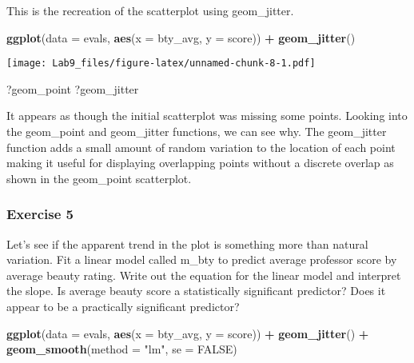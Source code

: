 \documentclass[
]{article}
\newenvironment{Shaded}{\begin{snugshade}}{\end{snugshade}}
\newcommand{\DataTypeTok}[1]{\textcolor[rgb]{0.13,0.29,0.53}{#1}}
\newcommand{\KeywordTok}[1]{\textcolor[rgb]{0.13,0.29,0.53}{\textbf{#1}}}
\newcommand{\NormalTok}[1]{#1}
\newcommand{\OperatorTok}[1]{\textcolor[rgb]{0.81,0.36,0.00}{\textbf{#1}}}
\newcommand{\OtherTok}[1]{\textcolor[rgb]{0.56,0.35,0.01}{#1}}
\newcommand{\StringTok}[1]{\textcolor[rgb]{0.31,0.60,0.02}{#1}}
\begin{document}
This is the recreation of the scatterplot using geom\_jitter.

\begin{Shaded}
\begin{Highlighting}[]
\KeywordTok{ggplot}\NormalTok{(}\DataTypeTok{data =}\NormalTok{ evals, }\KeywordTok{aes}\NormalTok{(}\DataTypeTok{x =}\NormalTok{ bty_avg, }\DataTypeTok{y =}\NormalTok{ score)) }\OperatorTok{+}
\StringTok{  }\KeywordTok{geom_jitter}\NormalTok{()}
\end{Highlighting}
\end{Shaded}

\texttt{[image: Lab9\_files/figure-latex/unnamed-chunk-8-1.pdf]}

\begin{Shaded}
\begin{Highlighting}[]
\NormalTok{?geom_point}
\NormalTok{?geom_jitter}
\end{Highlighting}
\end{Shaded}

It appears as though the initial scatterplot was missing some points.
Looking into the geom\_point and geom\_jitter functions, we can see why.
The geom\_jitter function adds a small amount of random variation to the
location of each point making it useful for displaying overlapping
points without a discrete overlap as shown in the geom\_point
scatterplot.

\hypertarget{exercise-5}{%
\subsubsection{Exercise 5}\label{exercise-5}}

Let's see if the apparent trend in the plot is something more than
natural variation. Fit a linear model called m\_bty to predict average
professor score by average beauty rating. Write out the equation for the
linear model and interpret the slope. Is average beauty score a
statistically significant predictor? Does it appear to be a practically
significant predictor?

\begin{Shaded}
\begin{Highlighting}[]
\KeywordTok{ggplot}\NormalTok{(}\DataTypeTok{data =}\NormalTok{ evals, }\KeywordTok{aes}\NormalTok{(}\DataTypeTok{x =}\NormalTok{ bty_avg, }\DataTypeTok{y =}\NormalTok{ score)) }\OperatorTok{+}
\StringTok{  }\KeywordTok{geom_jitter}\NormalTok{() }\OperatorTok{+}
\StringTok{  }\KeywordTok{geom_smooth}\NormalTok{(}\DataTypeTok{method =} \StringTok{"lm"}\NormalTok{, }\DataTypeTok{se =} \OtherTok{FALSE}\NormalTok{)}
\end{Highlighting}
\end{Shaded}
\end{document}
